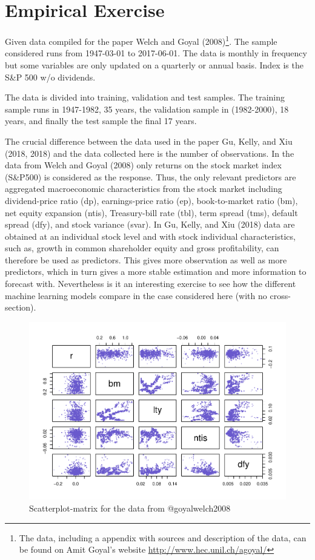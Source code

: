\documentclass[]{article}
\let\rmarkdownfootnote\footnote%
\def\footnote{\protect\rmarkdownfootnote}
\begin{document}
\hypertarget{empirical-exercise}{%
\section{Empirical Exercise}\label{empirical-exercise}}

Given data compiled for the paper Welch and Goyal (2008)\footnote{The
  data, including a appendix with sources and description of the data,
  can be found on Amit Goyal's website
  \url{http://www.hec.unil.ch/agoyal/}}. The sample considered runs from
1947-03-01 to 2017-06-01. The data is monthly in frequency but some
variables are only updated on a quarterly or annual basis. Index is the
S\&P 500 w/o dividends.

The data is divided into training, validation and test samples. The
training sample runs in 1947-1982, 35 years, the validation sample in
(1982-2000), 18 years, and finally the test sample the final 17 years.

The crucial difference between the data used in the paper Gu, Kelly, and
Xiu (2018, 2018) and the data collected here is the number of
observations. In the data from Welch and Goyal (2008) only returns on
the stock market index (S\&P500) is considered as the response. Thus,
the only relevant predictors are aggregated macroeconomic
characteristics from the stock market including dividend-price ratio
(dp), earnings-price ratio (ep), book-to-market ratio (bm), net equity
expansion (ntis), Treasury-bill rate (tbl), term spread (tms), default
spread (dfy), and stock variance (svar). In Gu, Kelly, and Xiu (2018)
data are obtained at an individual stock level and with stock individual
characteristics, such as, growth in common shareholder equity and gross
profitability, can therefore be used as predictors. This gives more
observation as well as more predictors, which in turn gives a more
stable estimation and more information to forecast with. Nevertheless is
it an interesting exercise to see how the different machine learning
models compare in the case considered here (with no cross-section).

\begin{figure}
\includegraphics[width=0.75\linewidth]{mark_files/figure-latex/unnamed-chunk-2-1} \caption{Scatterplot-matrix for the data from @goyalwelch2008}\label{fig:unnamed-chunk-2}
\end{figure}
\end{document}
